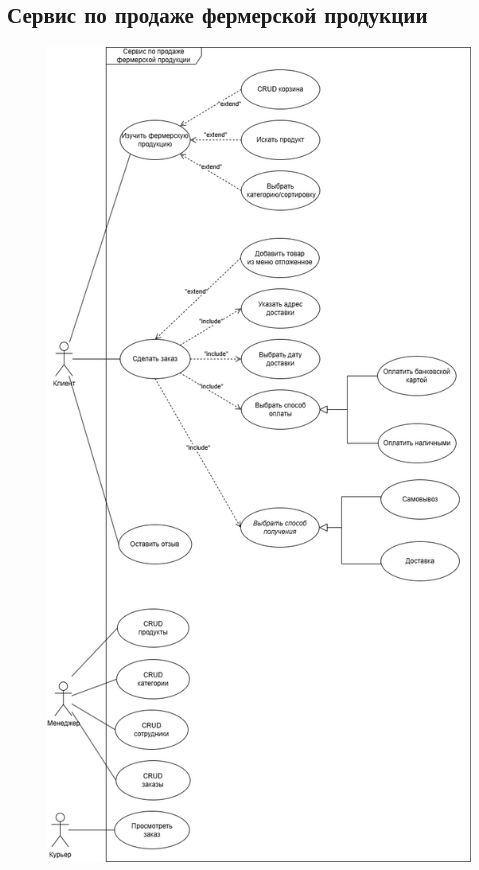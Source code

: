 \documentclass[a4paper]{report}
\begin{document}
\subsection{Сервис по продаже фермерской продукции}
\begin{figure}[H]
    \centering
    \includegraphics[height=0.9\textheight]{Диаграмма вариантов использования Сервис по продаже фермерской продукции.png}
\end{figure}
\end{document}

